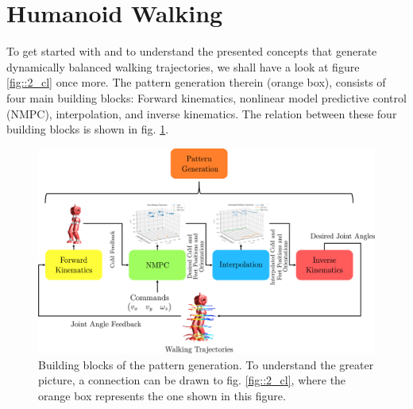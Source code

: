 \FloatBarrier
\section{Humanoid Walking}
\label{sec::21_hw}
To get started with and to understand the presented concepts that generate dynamically balanced walking trajectories, we shall have a look at figure \ref{fig::2_cl} once more. The pattern generation therein (orange box), consists of four main building blocks: Forward kinematics, nonlinear model predictive control (NMPC), interpolation, and inverse kinematics. The relation between these four building blocks is shown in fig. \ref{fig::21_pg}.
\begin{figure}[h!]
	\centering
	\includegraphics[scale=.5]{chapters/02_background/img/pattern_generation.png}
	\caption{Building blocks of the pattern generation. To understand the greater picture, a connection can be drawn to fig. \ref{fig::2_cl}, where the orange box represents the one shown in this figure.}
	\label{fig::21_pg}
\end{figure}
